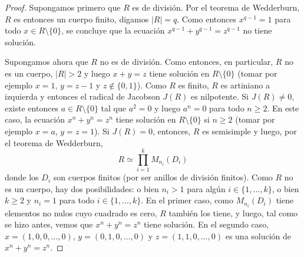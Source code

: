 \begin{proof}
	Supongamos primero que $R$ es de división. Por el teorema de Wedderburn,
	$R$ es entonces un cuerpo finito, digamos $|R|=q$. Como entonces
	$x^{q-1}=1$ para todo $x\in R\setminus\{0\}$, se concluye que la ecuación
	$x^{q-1}+y^{q-1}=z^{q-1}$ no tiene solución.

	Supongamos ahora que $R$ no es de división. Como entonces, en particular,
	$R$ no es un cuerpo, $|R|>2$ y luego $x+y=z$ tiene solución en
	$R\setminus\{0\}$ (tomar por ejemplo $x=1$, $y=z-1$ y $z\not\in\{0,1\}$).
	Como $R$ es finito, $R$ es artiniano a izquierda y entonces el radical de
	Jacobson $J(R)$ es nilpotente. Si $J(R)\ne 0$, existe entonces $a\in
	R\setminus\{0\}$ tal que $a^2=0$ y luego $a^n=0$ para todo $n\geq2$. En
	este caso, la ecuación $x^n+y^n=z^n$ tiene solución en $R\setminus\{0\}$ si
	$n\geq 2$ (tomar por ejemplo $x=a$, $y=z=1$). Si $J(R)=0$, entonces, $R$ es
	semisimple y luego, por el teorema de Wedderburn,
	\[
		R\simeq \prod_{i=1}^k M_{n_i}(D_i)
	\]
	donde los $D_i$ son cuerpos finitos (por ser anillos de división finitos).
	Como $R$ no es un cuerpo, hay dos posibilidades: o bien $n_i>1$ para algún
	$i\in\{1,\dots,k\}$, o bien $k\geq 2$ y $n_i=1$ para todo
	$i\in\{1,\dots,k\}$. En el primer caso, como $M_{n_i}(D_i)$ tiene elementos
	no nulos cuyo cuadrado es cero, $R$ también los tiene, y luego, tal como se
	hizo antes, vemos que $x^n+y^n=z^n$ tiene solución. En el segundo caso,
	$x=(1,0,0,\dots,0)$, $y=(0,1,0,\dots,0)$ y $z=(1,1,0,\dots,0)$ es una
	solución de $x^n+y^n=z^n$.
\end{proof}
